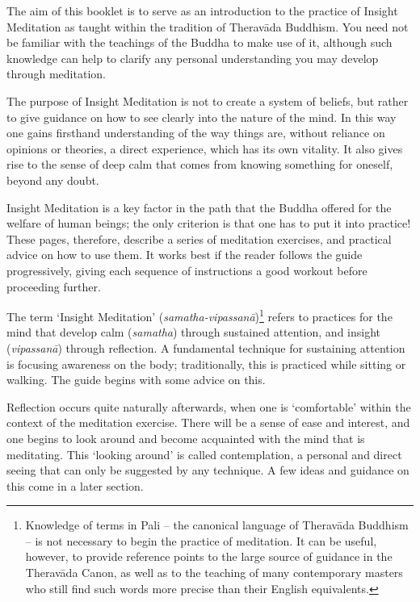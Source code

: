 
The aim of this booklet is to serve as an introduction to the practice
of Insight Meditation as taught within the tradition of Theravāda
Buddhism. You need not be familiar with the teachings of the Buddha to
make use of it, although such knowledge can help to clarify any personal
understanding you may develop through meditation.

The purpose of Insight Meditation is not to create a system of beliefs, but rather to
give guidance on how to see clearly into the nature of the mind. In
this way one gains firsthand understanding of the way things are,
without reliance on opinions or theories, a direct experience, which has
its own vitality. It also gives rise to the sense of deep calm that
comes from knowing something for oneself, beyond any doubt.

Insight Meditation is a key factor in the path that the Buddha offered for the
welfare of human beings; the only criterion is that one has to put it
into practice! These pages, therefore, describe a series of meditation
exercises, and practical advice on how to use them. It works best if the
reader follows the guide progressively, giving each sequence of
instructions a good workout before proceeding further.

The term `Insight Meditation' (\emph{samatha-vipassanā})\footnote{Knowledge of terms in Pali -- the canonical language of
Theravāda Buddhism -- is not necessary to begin the practice of
meditation. It can be useful, however, to provide reference points to
the large source of guidance in the Theravāda Canon, as well as to the
teaching of many contemporary masters who still find such words more
precise than their English equivalents.}
refers to
practices for the mind that develop calm (\emph{samatha}) through
sustained attention, and insight (\emph{vipassanā}) through reflection.
A fundamental technique for sustaining attention is focusing awareness
on the body; traditionally, this is practiced while sitting or walking.
The guide begins with some advice on this.

Reflection occurs quite naturally afterwards, when one is `comfortable' within the context of
the meditation exercise. There will be a sense of ease and interest, and
one begins to look around and become acquainted with the mind that is
meditating. This `looking around' is called contemplation, a personal
and direct seeing that can only be suggested by any technique. A few
ideas and guidance on this come in a later section.

